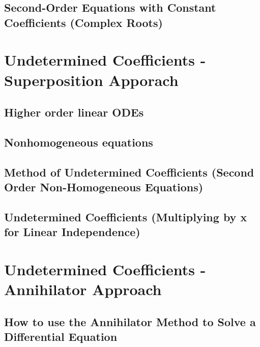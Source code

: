 \documentclass[10pt]{article}
\begin{document}
\subsection{Second-Order Equations with Constant Coefficients (Complex Roots)}

\section{Undetermined Coefficients - Superposition Apporach}
\subsection{Higher order linear ODEs}
\subsection{Nonhomogeneous equations}
\subsection{Method of Undetermined Coefficients (Second Order Non-Homogeneous Equations)}
\subsection{Undetermined Coefficients (Multiplying by x for Linear Independence)}

\section{Undetermined Coefficients - Annihilator Approach}
\subsection{How to use the Annihilator Method to Solve a Differential Equation}


\lipsum[1-4]
\end{document}
